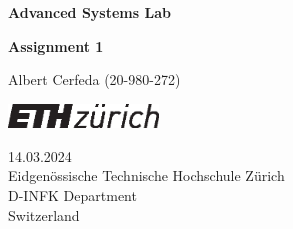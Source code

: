 \documentclass[tikz,14pt,fleqn]{article}
\newcommand\namesurname{Albert Cerfeda (20-980-272)}
\newcommand\assignment{Assignment 1}
\newcommand\subject{Advanced Systems Lab}
\newcommand\documentdate{14.03.2024}
\begin{document}
\begin{titlepage}
   \begin{center}
       \vspace*{0.2cm}

       \textbf{\Large{\subject}}

       \vspace{0.5cm}
        \textbf{\assignment}\\[5mm]
        
            
       \vspace{0.4cm}

        \namesurname
        \begin{figure}[H]
            \centering
        \end{figure}
       \tableofcontents

       \vspace*{\fill}
     
        \includegraphics[width=0.3\textwidth]{fig/eth_logo_kurz_pos.eps}
       
        \documentdate \\
        Eidgenössische Technische Hochschule Zürich\\
        D-INFK Department\\
        Switzerland\\

   \end{center}
\end{titlepage}


\end{document}
